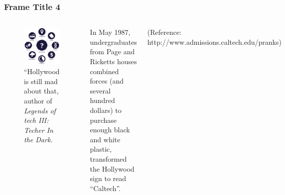 \begin{frame}
\frametitle{Frame Title 4}

\begin{columns}


\begin{figure}
    \centering
    \includegraphics[scale=.4]{figures/fig1.png}
    \caption{``Hollywood is still mad about that, author of \emph{Legends of tech III: Techer In the Dark.}}
    \label{fig:hollywood_prank}
\end{figure}


In May 1987, undergraduates from Page and Ricketts houses combined forces (and several hundred dollars) to purchase enough black and white plastic, transformed the Hollywood sign to read ``Caltech''.

\small{(Reference: http://www.admissions.caltech.edu/pranks)}

\end{columns}
\end{frame}
